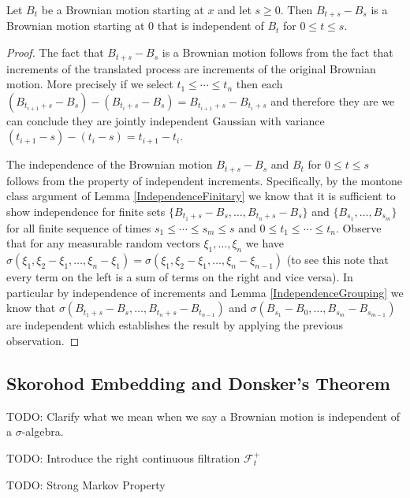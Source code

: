 \begin{thm}\label{BrownianMarkovProperty}Let $B_t$ be a Brownian motion starting at $x$ and let $s
  \geq 0$.  Then $B_{t+s} - B_s$ is a Brownian motion starting at $0$
  that is independent of $B_t$ for $0 \leq t \leq s$.
\end{thm}
\begin{proof}
The fact that $B_{t+s} - B_s$ is a Brownian motion follows from the
fact that increments of the translated process are increments of the
original Brownian motion.  More precisely if we select $t_1 \leq
\cdots \leq t_n$ then each $(B_{t_{i+1}+s} - B_s) - (B_{t_{i}+s} -
B_s) = B_{t_{i+1}+s} - B_{t_i + s}$ and therefore they are we can
conclude they are jointly independent Gaussian with variance $(t_{i+1}
- s) - (t_i - s) = t_{i+1} - t_i$.

The independence of the Brownian motion $B_{t+s} - B_s$ and $B_t$ for
$0 \leq t \leq s$ follows from the property of independent
increments.  Specifically, by the montone class argument of Lemma \ref{IndependenceFinitary} we know that it is sufficient
to show independence for finite sets $\lbrace B_{{t_1}+s} - B_s,
\dots ,B_{{t_n}+s} - B_s \rbrace$ and $\lbrace B_{s_1}, \dots,
B_{s_m}\rbrace$ for all finite sequence of times $s_1 \leq \cdots \leq s_m \leq s$ and $0 \leq t_1 \leq \cdots \leq
t_n$.  Observe that for any measurable random vectors $\xi_1, \dots ,
\xi_n$ we have $\sigma(\xi_1, \xi_2 - \xi_1, \dots,\xi_n - \xi_1) =
\sigma(\xi_1, \xi_2 - \xi_1, \dots,\xi_n - \xi_{n-1})$ (to see this
note that every term on the left is a sum of terms on the right and
vice versa).  In particular by independence of increments and Lemma
\ref{IndependenceGrouping} we know that $\sigma(B_{{t_1}+s} - B_s,
\dots ,B_{{t_n}+s} - B_{t_{n-1}})$ and $\sigma( B_{s_1} - B_0, \dots,
B_{s_m} - B_{s_{m-1}})$ are independent
which establishes the result by applying the previous observation.
\end{proof}

\subsection{Skorohod Embedding and Donsker's Theorem}
TODO: Clarify what we mean when we say a Brownian motion is
independent of a $\sigma$-algebra.

TODO: Introduce the right continuous filtration $\mathcal{F}^+_t$

TODO: Strong Markov Property

